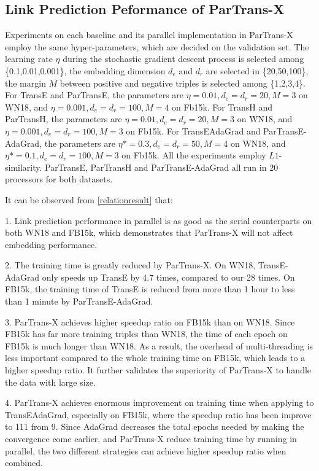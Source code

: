 \documentclass[sigconf]{acmart}
\begin{document}
\subsection{Link Prediction Peformance of ParTrans-X}

Experiments on each baseline and its parallel implementation in ParTrans-X employ the same hyper-parameters, which are decided on the validation set. The learning rate $\eta$ during the stochastic gradient descent process is selected among \{0.1,0.01,0.001\}, the embedding dimension $d_e$ and $d_r$ are selected in \{20,50,100\}, the margin $M$ between positive and negative triples is selected among \{1,2,3,4\}. For TransE and ParTransE, the parameters are  $\eta=0.01, d_e=d_r=20, M = 3$ on WN18, and $\eta=0.001, d_e=d_r=100, M = 4$ on Fb15k. For TransH and ParTransH, the parameters are $\eta=0.01, d_e=d_r=20, M = 3$ on WN18, and $\eta=0.001, d_e=d_r=100, M = 3$ on Fb15k. For TransEAdaGrad and ParTransE-AdaGrad, the parameters are $\eta*=0.3, d_e=d_r=50, M = 4$ on WN18, and $\eta*=0.1, d_e=d_r=100, M = 3$ on Fb15k.
All the experiments employ $L1$-similarity. 
ParTransE, ParTransH and ParTransE-AdaGrad all run in $20$ processors for both datasets.




It can be  observed from \tablename \ref{relationresult}  that:

1.   Link prediction performance in parallel is as good as the serial counterparts on both WN18 and FB15k, which demonstrates that ParTrans-X will not affect embedding performance.

2. The training time is greatly reduced by ParTrans-X. On WN18, TransE-AdaGrad only speeds up TransE by 4.7 times, compared to our 28 times. On FB15k, the training time of TransE is reduced from more than 1 hour to less than 1 minute by ParTransE-AdaGrad.

3.  ParTrans-X achieves higher speedup ratio on FB15k than on WN18. Since FB15k has far more training triples than WN18, the time of each epoch on FB15k is much longer than WN18.  As a result, the overhead of multi-threading is less important compared to the whole training time on FB15k,  which leads to a higher speedup ratio.
It further validates the superiority of ParTrans-X to handle the data with large size.

4. ParTrans-X achieves enormous improvement on training time when applying to TransEAdaGrad, especially on FB15k, where the speedup ratio has been improve to 111 from 9. Since AdaGrad decreases the total epochs needed by making the convergence come earlier, and ParTrans-X reduce training time by running in parallel, the two different strategies can achieve higher speedup ratio when combined.
\end{document}
